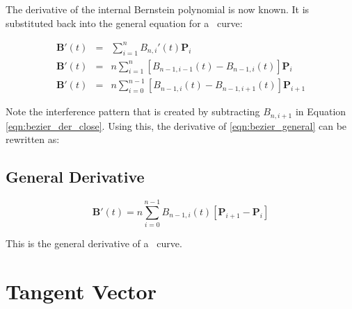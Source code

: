 \documentclass[oneside,usepdftitle=true]{article}
\begin{document}
The derivative of the internal Bernstein polynomial is now known.  It is substituted back into the general equation for a \Bezier\ curve:

\begin{eqnarray}
	\nonumber \mathbf{B}'(t) &=& \sum_{i=1}^{n} B_{n,i}'(t) \mathbf{P}_i \\
	\nonumber \mathbf{B}'(t) &=& n \sum_{i=1}^{n} [ B_{n-1,i-1}(t) - B_{n-1,i}(t) ] \mathbf{P}_i \\
	\label{eqn:bezier_der_close}
	\mathbf{B}'(t) &=& n \sum_{i=0}^{n-1} [ B_{n-1,i}(t) - B_{n-1,i+1}(t) ] \mathbf{P}_{i+1}
\end{eqnarray}

Note the interference pattern that is created by subtracting $B_{n,i+1}$ in Equation \eqref{eqn:bezier_der_close}{.}  Using this, the derivative of \eqref{eqn:bezier_general} can be rewritten as:

\subsection{General Derivative}\label{sec:gen_deriv}

\begin{equation}\label{eqn:bezier_deriv}
	\mathbf{B}'(t) = n \sum_{i=0}^{n-1} B_{n-1,i}(t) [ \mathbf{P}_{i+1} - \mathbf{P}_i ]
\end{equation}

This is the general derivative of a \Bezier\ curve.




\section{Tangent Vector}
\end{document}
